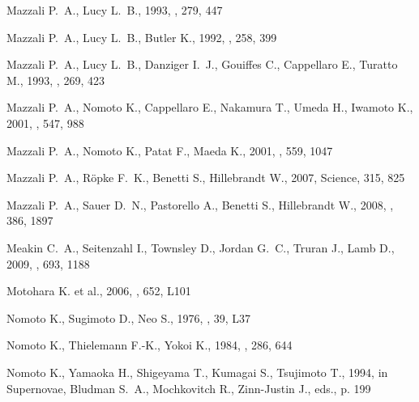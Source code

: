 \documentclass[usegraphicx,usenatbib]{mn2e}
\begin{document}
\begin{thebibliography}{99}
{Mazzali} P.~A., {Lucy} L.~B., 1993, \aap, 279, 447

{Mazzali} P.~A., {Lucy} L.~B., {Butler} K., 1992, \aap, 258, 399

{Mazzali} P.~A., {Lucy} L.~B., {Danziger} I.~J., {Gouiffes} C., {Cappellaro}
  E., {Turatto} M., 1993, \aap, 269, 423

{Mazzali} P.~A., {Nomoto} K., {Cappellaro} E., {Nakamura} T., {Umeda} H.,
  {Iwamoto} K., 2001{}, \apj, 547, 988

{Mazzali} P.~A., {Nomoto} K., {Patat} F., {Maeda} K., 2001{}, \apj,
  559, 1047

{Mazzali} P.~A., {R{\"o}pke} F.~K., {Benetti} S., {Hillebrandt} W., 2007,
  Science, 315, 825

{Mazzali} P.~A., {Sauer} D.~N., {Pastorello} A., {Benetti} S., {Hillebrandt}
  W., 2008, \mnras, 386, 1897

{Meakin} C.~A., {Seitenzahl} I., {Townsley} D., {Jordan} G.~C., {Truran} J.,
  {Lamb} D., 2009, \apj, 693, 1188

{Motohara} K. et al., 2006, \apjl, 652, L101

{Nomoto} K., {Sugimoto} D., {Neo} S., 1976, \apss, 39, L37

{Nomoto} K., {Thielemann} F.-K., {Yokoi} K., 1984, \apj, 286, 644

{Nomoto} K., {Yamaoka} H., {Shigeyama} T., {Kumagai} S., {Tsujimoto} T., 1994,
  in Supernovae, {Bludman} S.~A., {Mochkovitch} R., {Zinn-Justin} J., eds., p.
  199


\end{thebibliography}
\end{document}
